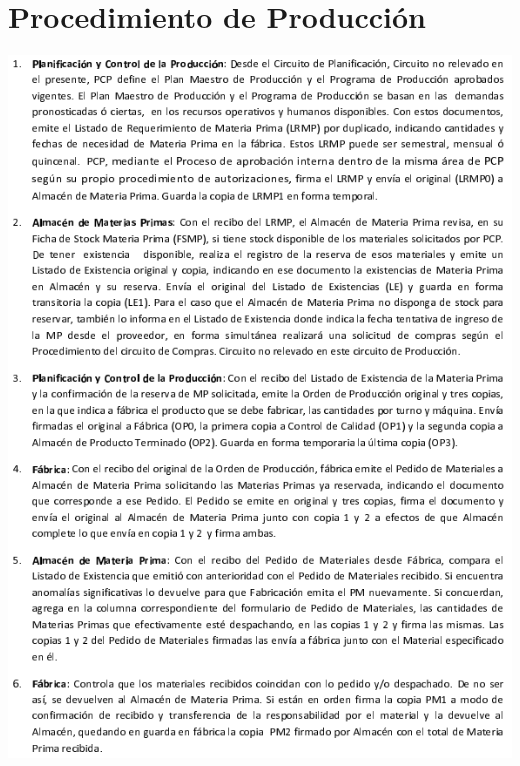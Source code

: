 \section{Procedimiento de Producci\'on}
\begin{center}
 \includegraphics[keepaspectratio=true]{./Circuitos-Teoricos/Produccion/Images/procedimiento-produccion.png}
\end{center}
